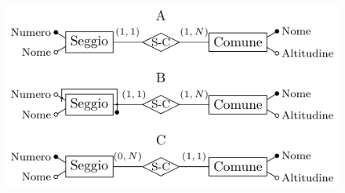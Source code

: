 \documentclass{article}
\begin{document}
\begin{figure}[H]%
    \centering%
    \includegraphics[scale=1.25]{schema_elezioni_25-11-24.pdf}%
\end{figure}
\end{document}
